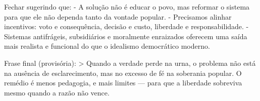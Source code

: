 Fechar sugerindo que:
- A solução não é educar o povo, mas reformar o sistema para que ele não dependa tanto da vontade popular.
- Precisamos alinhar incentivos: voto e consequência, decisão e custo, liberdade e responsabilidade.
- Sistemas antifrágeis, subsidiários e moralmente enraizados oferecem uma saída mais realista e funcional do que o idealismo democrático moderno.

Frase final (provisória):  
> Quando a verdade perde na urna, o problema não está na ausência de esclarecimento, mas no excesso de fé na soberania popular. O remédio é menos pedagogia, e mais limites — para que a liberdade sobreviva mesmo quando a razão não vence.

